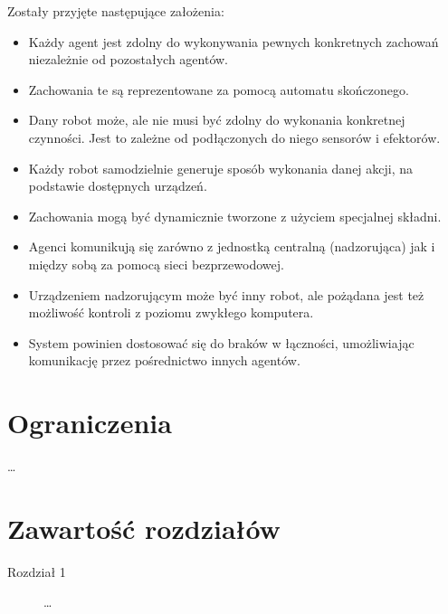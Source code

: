 Zostały przyjęte następujące założenia:
\begin{itemize}
  \item Każdy agent jest zdolny do wykonywania pewnych konkretnych zachowań niezależnie od pozostałych agentów.
  \item Zachowania te są reprezentowane za pomocą automatu skończonego.
  \item Dany robot może, ale nie musi być zdolny do wykonania konkretnej czynności. Jest to zależne od podłączonych do niego sensorów i efektorów.
  \item Każdy robot samodzielnie generuje sposób wykonania danej akcji, na podstawie dostępnych urządzeń.
  \item Zachowania mogą być dynamicznie tworzone z użyciem specjalnej składni.
  \item Agenci komunikują się zarówno z jednostką centralną (nadzorująca) jak i między sobą za pomocą sieci bezprzewodowej.
  \item Urządzeniem nadzorującym może być inny robot, ale pożądana jest też możliwość kontroli z poziomu zwykłego komputera.
  \item System powinien dostosować się do braków w łączności, umożliwiając komunikację przez pośrednictwo innych agentów.
\end{itemize}

\section{Ograniczenia}

\ldots

\section{Zawartość rozdziałów}

\begin{description}
  \item[Rozdział 1] \ldots
\end{description}

